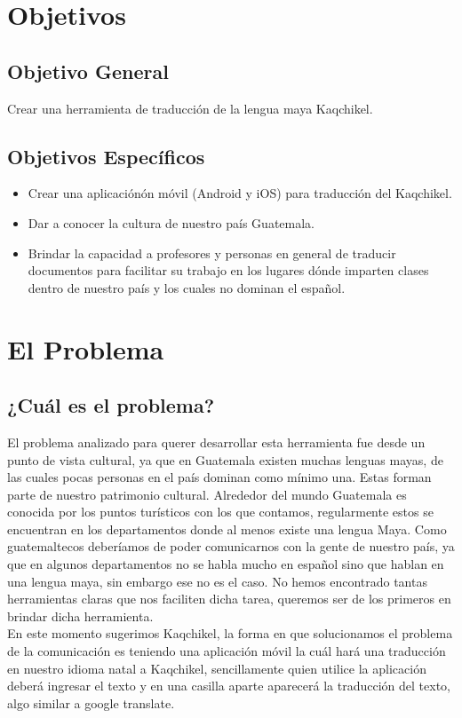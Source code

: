 \documentclass[a4paper,openright,11pt]{article}
\begin{document}
\section{Objetivos}
\subsection{Objetivo General}
Crear una herramienta de traducción de la lengua maya Kaqchikel.
\subsection{Objetivos Espec\'ificos}
\begin{itemize}
    \item Crear una aplicación\'on móvil (Android y iOS) para traducción del Kaqchikel.
    \item Dar a conocer la cultura de nuestro pa\'is Guatemala.
    \item Brindar la capacidad a profesores y personas en general de traducir documentos para facilitar su trabajo en los lugares d\'onde imparten clases dentro de nuestro pa\'is y los cuales no dominan el español.
\end{itemize}
\newpage

\section{El Problema}
\subsection{¿Cuál es el problema?}
El problema analizado para querer desarrollar esta herramienta fue desde un punto de vista cultural, ya que en Guatemala existen muchas lenguas mayas, de las cuales pocas personas en el pa\'is dominan como mínimo una. Estas forman parte de nuestro patrimonio cultural. Alrededor del mundo Guatemala es conocida por los puntos turísticos con los que contamos, regularmente estos se encuentran en los departamentos donde al menos existe una lengua Maya.  Como guatemaltecos deberíamos de poder comunicarnos con la gente de nuestro pa\'is, ya que en algunos departamentos no se habla mucho en español sino que hablan en una lengua maya, sin embargo ese no es el caso. No hemos encontrado tantas herramientas claras que nos faciliten dicha tarea, queremos ser de los primeros en brindar dicha herramienta.\\

En este momento sugerimos Kaqchikel, la forma en que solucionamos el problema de la comunicación es teniendo una aplicación m\'ovil la cu\'al hará una traducción en nuestro idioma natal a Kaqchikel, sencillamente quien utilice la aplicación deberá ingresar el texto y en una casilla aparte aparecer\'a la traducci\'on del texto, algo similar a google translate.\\
\end{document}
